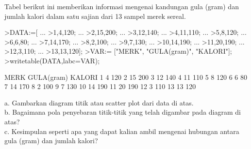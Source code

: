 \documentclass[a4paper,10pt]{article}
\begin{document}
\begin{eulernotebook}
\begin{eulercomment}
\begin{eulercomment}
\begin{eulercomment}
\begin{eulercomment}
\begin{eulercomment}
\begin{eulercomment}
\begin{eulercomment}
\begin{eulercomment}
\begin{eulercomment}
\begin{eulercomment}
\begin{eulercomment}
\begin{eulercomment}
\begin{eulercomment}
\begin{eulercomment}
\begin{eulercomment}
\begin{eulercomment}
\begin{eulercomment}
\begin{eulercomment}
\begin{eulercomment}
\end{eulercomment}
\eulersubheading{}
\begin{eulercomment}
Tabel berikut ini memberikan informasi mengenai kandungan gula (gram)
dan jumlah kalori dalam satu sajian dari 13 sampel merek sereal.
\end{eulercomment}
\begin{eulerprompt}
>DATA:=[ ...
>1,4,120; ...
>2,15,200; ...
>3,12,140; ...
>4,11,110; ...
>5,8,120; ...
>6,6,80; ...
>7,14,170; ...
>8,2,100; ...
>9,7,130; ...
>10,14,190; ...
>11,20,190; ...
>12,3,110; ...
>13,13,120];
>VAR:= ["MERK", "GULA(gram)", "KALORI"];
>writetable(DATA,labc=VAR);
\end{eulerprompt}
\begin{euleroutput}
        MERK GULA(gram)    KALORI
           1          4       120
           2         15       200
           3         12       140
           4         11       110
           5          8       120
           6          6        80
           7         14       170
           8          2       100
           9          7       130
          10         14       190
          11         20       190
          12          3       110
          13         13       120
\end{euleroutput}
\begin{eulercomment}
a. Gambarkan diagram titik atau scatter plot dari data di atas.\\
b. Bagaimana pola penyebaran titik-titik yang telah digambar pada
diagram di atas?\\
c. Kesimpulan seperti apa yang dapat kalian ambil mengenai hubungan
antara gula (gram) dan jumlah kalori?


\end{eulercomment}
\end{eulercomment}
\end{eulercomment}
\end{eulercomment}
\end{eulercomment}
\end{eulercomment}
\end{eulercomment}
\end{eulercomment}
\end{eulercomment}
\end{eulercomment}
\end{eulercomment}
\end{eulercomment}
\end{eulercomment}
\end{eulercomment}
\end{eulercomment}
\end{eulercomment}
\end{eulercomment}
\end{eulercomment}
\end{eulercomment}
\end{eulernotebook}
\end{document}
